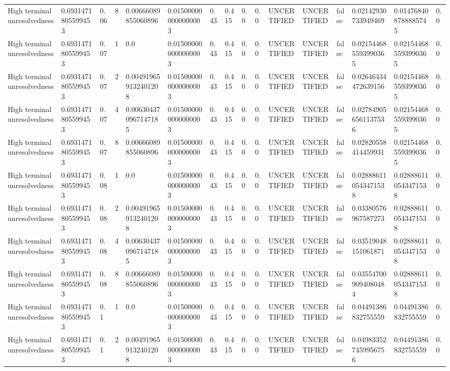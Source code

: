 \begin{tabular}{llllllllllllllll}
High terminal unresolvedness & 0.6931471805599453 & 0.06 & 8 & 0.00666089855060896 & 0.015000000000000003 & 0.43 & 0.415 & 0.0 & 0.0 & UNCERTIFIED & UNCERTIFIED & false & 0.02142930733949469 & 0.014768408788885745 & 0.0 \\
High terminal unresolvedness & 0.6931471805599453 & 0.07 & 1 & 0.0 & 0.015000000000000003 & 0.43 & 0.415 & 0.0 & 0.0 & UNCERTIFIED & UNCERTIFIED & false & 0.021544685593990365 & 0.021544685593990365 & 0.0 \\
High terminal unresolvedness & 0.6931471805599453 & 0.07 & 2 & 0.004919659132401208 & 0.015000000000000003 & 0.43 & 0.415 & 0.0 & 0.0 & UNCERTIFIED & UNCERTIFIED & false & 0.02646434472639156 & 0.021544685593990365 & 0.0 \\
High terminal unresolvedness & 0.6931471805599453 & 0.07 & 4 & 0.006304370967147185 & 0.015000000000000003 & 0.43 & 0.415 & 0.0 & 0.0 & UNCERTIFIED & UNCERTIFIED & false & 0.027849056561137536 & 0.021544685593990365 & 0.0 \\
High terminal unresolvedness & 0.6931471805599453 & 0.07 & 8 & 0.00666089855060896 & 0.015000000000000003 & 0.43 & 0.415 & 0.0 & 0.0 & UNCERTIFIED & UNCERTIFIED & false & 0.02820558414459931 & 0.021544685593990365 & 0.0 \\
High terminal unresolvedness & 0.6931471805599453 & 0.08 & 1 & 0.0 & 0.015000000000000003 & 0.43 & 0.415 & 0.0 & 0.0 & UNCERTIFIED & UNCERTIFIED & false & 0.028886110543471538 & 0.028886110543471538 & 0.0 \\
High terminal unresolvedness & 0.6931471805599453 & 0.08 & 2 & 0.004919659132401208 & 0.015000000000000003 & 0.43 & 0.415 & 0.0 & 0.0 & UNCERTIFIED & UNCERTIFIED & false & 0.03380576967587273 & 0.028886110543471538 & 0.0 \\
High terminal unresolvedness & 0.6931471805599453 & 0.08 & 4 & 0.006304370967147185 & 0.015000000000000003 & 0.43 & 0.415 & 0.0 & 0.0 & UNCERTIFIED & UNCERTIFIED & false & 0.03519048151061871 & 0.028886110543471538 & 0.0 \\
High terminal unresolvedness & 0.6931471805599453 & 0.08 & 8 & 0.00666089855060896 & 0.015000000000000003 & 0.43 & 0.415 & 0.0 & 0.0 & UNCERTIFIED & UNCERTIFIED & false & 0.035547009094080484 & 0.028886110543471538 & 0.0 \\
High terminal unresolvedness & 0.6931471805599453 & 0.1 & 1 & 0.0 & 0.015000000000000003 & 0.43 & 0.415 & 0.0 & 0.0 & UNCERTIFIED & UNCERTIFIED & false & 0.04491386832755559 & 0.04491386832755559 & 0.0 \\
High terminal unresolvedness & 0.6931471805599453 & 0.1 & 2 & 0.004919659132401208 & 0.015000000000000003 & 0.43 & 0.415 & 0.0 & 0.0 & UNCERTIFIED & UNCERTIFIED & false & 0.049833527459956756 & 0.04491386832755559 & 0.0 \\

\end{tabular}
